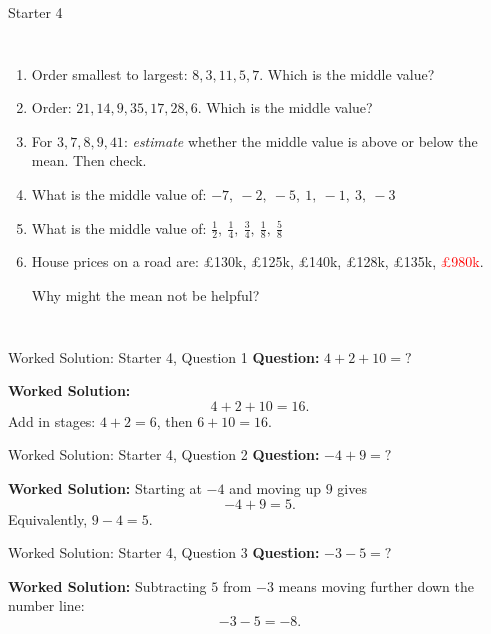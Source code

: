 \documentclass{beamer}
\newcommand{\ashow}[1]{\uncover<2->{\textcolor{red}{\small #1}}}
\begin{document}
\begin{frame}{Starter 4}
\begin{columns}[T]
\begin{enumerate}\itemsep1pt
\setcounter{enumi}{4}

  \item Order smallest to largest:
  $8,3,11,5,7$.
  Which is the middle value? \ashow{7}

  \item Order:
  $21,14,9,35,17,28,6$.
  Which is the middle value? \ashow{17}

  \item For $3,7,8,9,41$:
  \textit{estimate} whether the middle value is above or below the mean.
  Then check. \ashow{below: median $8$, mean $13.6$}

  \item What is the middle value of:
  $-7,\ -2,\ -5,\ 1,\ -1,\ 3,\ -3$ \ashow{$-2$}

  \item What is the middle value of:
  $\tfrac{1}{2},\ \tfrac{1}{4},\ \tfrac{3}{4},\ \tfrac{1}{8},\ \tfrac{5}{8}$ \ashow{$\frac{1}{2}$}

  \item House prices on a road are:
  \pounds130k,
  \pounds125k,
  \pounds140k,
  \pounds128k,
  \pounds135k,
  \textcolor{red}{\pounds980k}.

  Why might the mean not be helpful? \ashow{the \pounds980k outlier pulls the mean up}

\end{enumerate}

\end{columns}

\end{frame}

\begin{frame}{Worked Solution: Starter 4, Question 1}
\hypertarget{work-st4}{}
\textbf{Question:} \(4 + 2 + 10 = ?\)

\textbf{Worked Solution:}
\[
4 + 2 + 10 = 16.
\]
Add in stages: \(4 + 2 = 6\), then \(6 + 10 = 16\).
\end{frame}

\begin{frame}{Worked Solution: Starter 4, Question 2}
\textbf{Question:} \(-4 + 9 = ?\)

\textbf{Worked Solution:}
Starting at \(-4\) and moving up \(9\) gives
\[
-4 + 9 = 5.
\]
Equivalently, \(9 - 4 = 5\).
\end{frame}

\begin{frame}{Worked Solution: Starter 4, Question 3}
\textbf{Question:} \(-3 - 5 = ?\)

\textbf{Worked Solution:}
Subtracting \(5\) from \(-3\) means moving further down the number line:
\[
-3 - 5 = -8.
\]
\end{frame}
\end{document}
